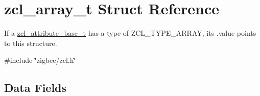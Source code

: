 \hypertarget{structzcl__array__t}{\section{zcl\-\_\-array\-\_\-t Struct Reference}
\label{structzcl__array__t}
}


If a \hyperlink{structzcl__attribute__base__t}{zcl\-\_\-attribute\-\_\-base\-\_\-t} has a type of Z\-C\-L\-\_\-\-T\-Y\-P\-E\-\_\-\-A\-R\-R\-A\-Y, its .value points to this structure.  




{\ttfamily \#include \char`\"{}zigbee/zcl.\-h\char`\"{}}

\subsection*{Data Fields}
